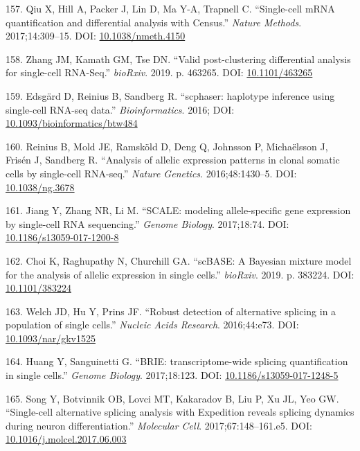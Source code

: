 \documentclass[11pt,a4paper,titlepage,twoside,openright]{style/unimelbthesis}
\theoremstyle{definition}
\theoremstyle{definition}
\theoremstyle{definition}
\theoremstyle{remark}
\begin{document}
\begin{mainmatter}
\leavevmode\hypertarget{ref-Qiu2017-bi}{}%
157. Qiu X, Hill A, Packer J, Lin D, Ma Y-A, Trapnell C. ``Single-cell mRNA quantification and differential analysis with Census.'' \emph{Nature Methods}. 2017;14:309--15. DOI: \href{https://doi.org/10.1038/nmeth.4150}{10.1038/nmeth.4150}

\leavevmode\hypertarget{ref-Zhang2019-rv}{}%
158. Zhang JM, Kamath GM, Tse DN. ``Valid post-clustering differential analysis for single-cell RNA-Seq.'' \emph{bioRxiv}. 2019. p. 463265. DOI: \href{https://doi.org/10.1101/463265}{10.1101/463265}

\leavevmode\hypertarget{ref-Edsgard2016-bn}{}%
159. Edsgärd D, Reinius B, Sandberg R. ``scphaser: haplotype inference using single-cell RNA-seq data.'' \emph{Bioinformatics}. 2016; DOI: \href{https://doi.org/10.1093/bioinformatics/btw484}{10.1093/bioinformatics/btw484}

\leavevmode\hypertarget{ref-Reinius2016-hu}{}%
160. Reinius B, Mold JE, Ramsköld D, Deng Q, Johnsson P, Michaëlsson J, Frisén J, Sandberg R. ``Analysis of allelic expression patterns in clonal somatic cells by single-cell RNA-seq.'' \emph{Nature Genetics}. 2016;48:1430--5. DOI: \href{https://doi.org/10.1038/ng.3678}{10.1038/ng.3678}

\leavevmode\hypertarget{ref-Jiang2017-sb}{}%
161. Jiang Y, Zhang NR, Li M. ``SCALE: modeling allele-specific gene expression by single-cell RNA sequencing.'' \emph{Genome Biology}. 2017;18:74. DOI: \href{https://doi.org/10.1186/s13059-017-1200-8}{10.1186/s13059-017-1200-8}

\leavevmode\hypertarget{ref-Choi2019-gt}{}%
162. Choi K, Raghupathy N, Churchill GA. ``scBASE: A Bayesian mixture model for the analysis of allelic expression in single cells.'' \emph{bioRxiv}. 2019. p. 383224. DOI: \href{https://doi.org/10.1101/383224}{10.1101/383224}

\leavevmode\hypertarget{ref-Welch2016-dv}{}%
163. Welch JD, Hu Y, Prins JF. ``Robust detection of alternative splicing in a population of single cells.'' \emph{Nucleic Acids Research}. 2016;44:e73. DOI: \href{https://doi.org/10.1093/nar/gkv1525}{10.1093/nar/gkv1525}

\leavevmode\hypertarget{ref-Huang2017-lp}{}%
164. Huang Y, Sanguinetti G. ``BRIE: transcriptome-wide splicing quantification in single cells.'' \emph{Genome Biology}. 2017;18:123. DOI: \href{https://doi.org/10.1186/s13059-017-1248-5}{10.1186/s13059-017-1248-5}

\leavevmode\hypertarget{ref-Song2017-ym}{}%
165. Song Y, Botvinnik OB, Lovci MT, Kakaradov B, Liu P, Xu JL, Yeo GW. ``Single-cell alternative splicing analysis with Expedition reveals splicing dynamics during neuron differentiation.'' \emph{Molecular Cell}. 2017;67:148--161.e5. DOI: \href{https://doi.org/10.1016/j.molcel.2017.06.003}{10.1016/j.molcel.2017.06.003}


\end{mainmatter}
\end{document}
